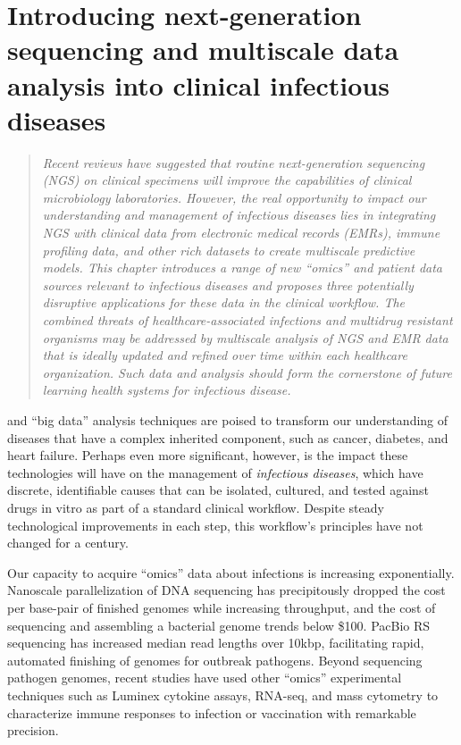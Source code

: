
\chapter{Introducing next-generation sequencing and multiscale data analysis into clinical infectious diseases}
\label{chap:intro}

\begin{quote}
\emph{Recent reviews have suggested that routine next-generation sequencing (NGS) on clinical specimens will improve the capabilities of clinical microbiology laboratories. However, the real opportunity to impact our understanding and management of infectious diseases lies in integrating NGS with clinical data from electronic medical records (EMRs), immune profiling data, and other rich datasets to create multiscale predictive models. This chapter introduces a range of new “omics” and patient data sources relevant to infectious diseases and proposes three potentially disruptive applications for these data in the clinical workflow. The combined threats of healthcare-associated infections and multidrug resistant organisms may be addressed by multiscale analysis of NGS and EMR data that is ideally updated and refined over time within each healthcare organization. Such data and analysis should form the cornerstone of future learning health systems for infectious disease.}
\end{quote}

 and “big data” analysis techniques are poised to transform our understanding of diseases that have a complex inherited component, such as cancer, diabetes, and heart failure. Perhaps even more significant, however, is the impact these technologies will have on the management of \emph{infectious diseases}, which have discrete, identifiable causes that can be isolated, cultured, and tested against drugs in vitro as part of a standard clinical workflow. Despite steady technological improvements in each step, this workflow’s principles have not changed for a century.\autocite{Didelot2012,Koser2012}

Our capacity to acquire “omics” data about infections is increasing exponentially. Nanoscale parallelization of DNA sequencing has precipitously dropped the cost per base-pair of finished genomes while increasing throughput, and the cost of sequencing and assembling a bacterial genome trends below \$100.\autocite{Didelot2012} PacBio RS sequencing has increased median read lengths over 10kbp, facilitating rapid, automated finishing of genomes for outbreak pathogens.\autocite{Chin2011,Rasko2011} Beyond sequencing pathogen genomes, recent studies have used other “omics” experimental techniques such as Luminex cytokine assays, RNA-seq, and mass cytometry to characterize immune responses to infection or vaccination with remarkable precision.\autocite{Mejias2014,Querec2009}

